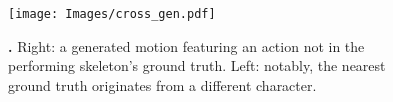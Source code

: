 \begin{figure}
    

    \centering
    
    \texttt{[image: Images/cross\_gen.pdf]}
    
    \caption{
        \textbf{\Crossgen.} 
        Right: a generated motion featuring an action not in the performing skeleton’s ground truth.
        Left: notably, the nearest ground truth originates from a different character.
    }
    \label{fig:cross_gen}
    \Description[]{}  %
\end{figure}
